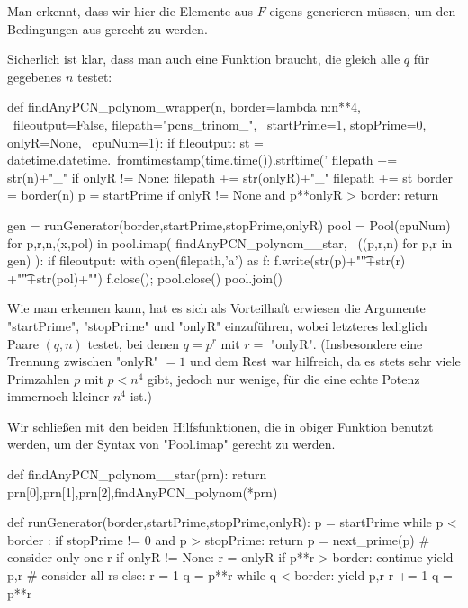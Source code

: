 Man erkennt, dass wir hier die Elemente aus $F$ eigens generieren müssen, um
den Bedingungen aus  gerecht zu werden.

Sicherlich ist klar, dass man auch eine Funktion braucht, die gleich alle
$q$ für gegebenes $n$ testet:


\begin{sagecode}[caption={Aus \url{../Sage/findAnyPCN_trinom.spyx}}]
def findAnyPCN_polynom_wrapper(n, border=lambda n:n**4, \
        fileoutput=False, filepath="pcns_trinom_", \
        startPrime=1, stopPrime=0, onlyR=None, \
        cpuNum=1):
    if fileoutput:
        st = datetime.datetime.\
                fromtimestamp(time.time()).strftime('%
        filepath += str(n)+"_"
        if onlyR != None: filepath += str(onlyR)+"_"
        filepath += st
    border = border(n)
    p = startPrime
    if onlyR != None and p**onlyR > border: return

    gen = runGenerator(border,startPrime,stopPrime,onlyR)
    pool = Pool(cpuNum)
    for p,r,n,(x,pol) in pool.imap( findAnyPCN_polynom__star, \
            ((p,r,n) for p,r in gen) ):
        if fileoutput:
            with open(filepath,'a') as f:
                f.write(str(p)+"\t"+str(r)
                        +"\t"+str(pol)+"\n")
            f.close();
    pool.close()
    pool.join()
\end{sagecode}

Wie man erkennen kann, hat es sich als Vorteilhaft erwiesen die Argumente
"startPrime", "stopPrime" und "onlyR" einzuführen, wobei letzteres lediglich
Paare $(q,n)$ testet, bei denen $q = p^r$ mit $r=$ "onlyR". (Insbesondere eine
Trennung zwischen "onlyR" $=1$ und dem Rest war hilfreich, da es stets sehr
viele Primzahlen $p$ mit $p<n^4$ gibt, jedoch nur wenige, für die eine echte
Potenz immernoch kleiner $n^4$ ist.)


Wir schließen mit den beiden Hilfsfunktionen, die in obiger Funktion
benutzt werden, um der Syntax von "Pool.imap" gerecht zu werden.

\begin{sagecode}[caption={Aus \url{../Sage/findAnyPCN_trinom.spyx}}]
def findAnyPCN_polynom__star(prn):
    return prn[0],prn[1],prn[2],findAnyPCN_polynom(*prn)
\end{sagecode}


\begin{sagecode}[caption={Aus \url{../Sage/findAnyPCN_trinom.spyx}}]
def runGenerator(border,startPrime,stopPrime,onlyR):
    p = startPrime
    while p < border :
        if stopPrime != 0 and p > stopPrime: return
        p = next_prime(p)
        # consider only one r
        if onlyR != None:
            r = onlyR
            if p**r > border: continue
            yield p,r
        # consider all rs
        else:
            r = 1
            q = p**r
            while q < border:
                yield p,r
                r += 1
                q = p**r
\end{sagecode}

